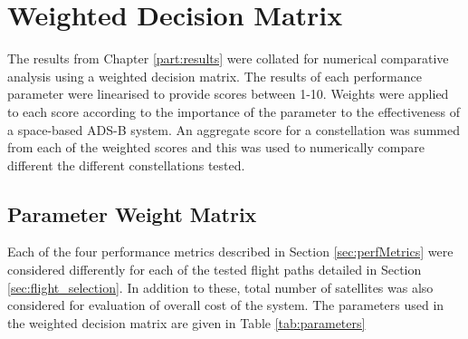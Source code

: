 \section{Weighted Decision Matrix}
\label{sec:decision_matrix}
The results from Chapter \ref{part:results} were collated for numerical comparative analysis using a weighted decision matrix. The results of each performance parameter were linearised to provide scores between 1-10. Weights were applied to each score according to the importance of the parameter to the effectiveness of a space-based ADS-B system. An aggregate score for a constellation was summed from each of the weighted scores and this was used to numerically compare different the different constellations tested.

\subsection{Parameter Weight Matrix}
Each of the four performance metrics described in Section \ref{sec:perfMetrics} were considered differently for each of the tested flight paths detailed in Section \ref{sec:flight_selection}. In addition to these, total number of satellites was also considered for evaluation of overall cost of the system. The parameters used in the weighted decision matrix are given in Table \ref{tab:parameters}

